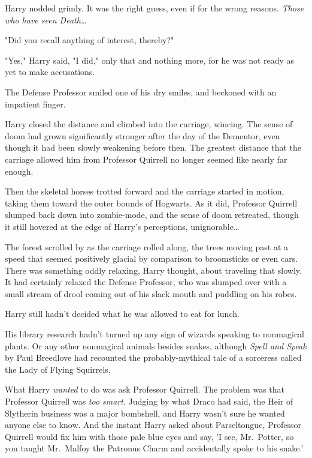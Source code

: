 Harry nodded grimly. It was the right guess, even if for the wrong reasons. 
\emph{Those who have seen Death{\ldots}}

"Did you recall anything of interest, thereby?"

"Yes," Harry said, "I did," only that and nothing more, for he was not ready as 
yet to make accusations.

The Defense Professor smiled one of his dry smiles, and beckoned with an 
impatient finger.

Harry closed the distance and climbed into the carriage, wincing. The sense of 
doom had grown significantly stronger after the day of the Dementor, even 
though it had been slowly weakening before then. The greatest distance that the 
carriage allowed him from Professor Quirrell no longer seemed like nearly far 
enough.

Then the skeletal horses trotted forward and the carriage started in motion, 
taking them toward the outer bounds of Hogwarts. As it did, Professor Quirrell 
slumped back down into zombie-mode, and the sense of doom retreated, though it 
still hovered at the edge of Harry's perceptions, unignorable{\ldots}

The forest scrolled by as the carriage rolled along, the trees moving past at a 
speed that seemed positively glacial by comparison to broomsticks or even cars. 
There was something oddly relaxing, Harry thought, about traveling that slowly. 
It had certainly relaxed the Defense Professor, who was slumped over with a 
small stream of drool coming out of his slack mouth and puddling on his robes.

Harry still hadn't decided what he was allowed to eat for lunch.

His library research hadn't turned up any sign of wizards speaking to 
nonmagical plants. Or any other nonmagical animals besides snakes, although 
\emph{Spell and Speak} by Paul Breedlove had recounted the probably-mythical 
tale of a sorceress called the Lady of Flying Squirrels.

What Harry \emph{wanted} to do was ask Professor Quirrell. The problem was that 
Professor Quirrell was \emph{too smart}. Judging by what Draco had said, the 
Heir of Slytherin business was a major bombshell, and Harry wasn't sure he 
wanted anyone else to know. And the instant Harry asked about Parseltongue, 
Professor Quirrell would fix him with those pale blue eyes and say, 'I see, 
Mr.~Potter, so you taught Mr.~Malfoy the Patronus Charm and accidentally spoke 
to his snake.'

